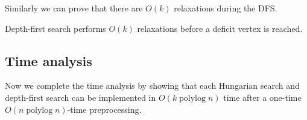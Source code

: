 \documentclass[a4paper,UKenglish]{socg-lipics-v2018}
\def\polylog{\mathop{\mathrm{polylog}}}
\theoremstyle{plain}
\numberwithin{figure}{section}
\begin{document}
Similarly we can prove that there are $O(k)$ relaxations during the DFS.

\begin{corollary}
\label{corollary:goldberg_dfs_length}
Depth-first search performs $O(k)$ relaxations before a deficit vertex is reached.
\end{corollary}


\subsection{Time analysis}

Now we complete the time analysis
by showing that each Hungarian search and depth-first search can be implemented in $O(k \polylog n)$ time after a one-time $O(n \polylog n)$-time preprocessing.
\end{document}
